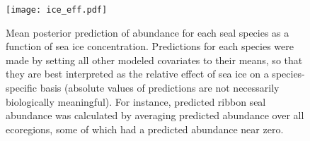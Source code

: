 \documentclass[12pt,fleqn]{article}
\begin{document}
\begin{flushleft}
\begin{figure}
\begin{center}
\texttt{[image: ice\_eff.pdf]}
\end{center}
\caption{Mean posterior prediction of abundance for each seal species as a function of sea ice concentration.  Predictions for each species were made by setting all other modeled covariates to their means, so that they are best interpreted as the relative effect of sea ice on a species-specific basis (absolute values of predictions are not necessarily biologically meaningful).  For instance, predicted ribbon seal abundance was calculated by averaging predicted abundance over all ecoregions, some of which had a predicted abundance near zero.}
\label{fig:ice_eff}
\end{figure}

\end{flushleft}
\end{document}
